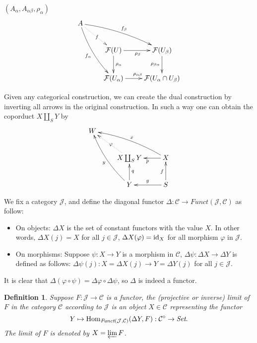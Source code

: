 \documentclass[9pt]{extarticle}
\theoremstyle{plain}
\newtheorem{defi}{Definition}
\newcommand{\cc}{\mathcal{C}}
\begin{document}
$(A_\alpha,A_{\alpha\beta},\rho_{\alpha})$
\[
\begin{xy}
	\xymatrix{
		A \ar@/_/[ddr]_{f_\alpha} \ar@{.>}[dr]|{f} \ar@/^/[drr]^{f_\beta} \\  
	 	& \calf(U) \ar[d]^{\rho_\alpha} \ar[r]_{\rho_\beta} & \calf(U_\beta) \ar[d]_{\rho_{\beta\alpha}} \\
	 	& \calf(U_\alpha) \ar[r]^{\rho_{\alpha\beta}} & \calf(U_{\alpha}\cap U_\beta)
	}
\end{xy}
\]

Given any categorical construction, we can create the dual construction by inverting all arrows in the original construction. In such a way one can obtain the coporduct $X\coprod_S Y$ by
\[
\begin{xy}
	\xymatrix{
		W\\  
	 	& X \coprod_S Y \ar@{.>}[lu]|{\varphi} & X \ar[l]^p\ar@/_/[ull]_x  \\
	 	& Y \ar@/^/[uul]^y  \ar[u]_q& S\ar[u]^f\ar[l]_g
	}
\end{xy}
\]


We fix a category $\mathcal{J}$, and define the diagonal functor $\Delta:\cc\to \textit{Funct}(\mathcal{J},\cc)$ as follow:
\begin{itemize}
\item On objects: $\Delta X$ is the set of constant functors with the value $X$. In other words, $\Delta X(j)=X$ for all $j\in\mathcal{J}$, $\Delta X(\varphi)=\operatorname{id}_X$ for all morphism $\varphi$ in $\mathcal{J}$.
\item On morphisms: Suppose $\psi:X\to Y$ is a morphism in $\cc$, $\Delta\psi:\Delta X\to \Delta Y$ is defined as follows: $\Delta\psi(j):X=\Delta X(j)\to Y=\Delta Y(j)$ for all $j\in \mathcal{J}$.
\end{itemize}
It is clear that $\Delta(\varphi\circ\psi)=\Delta\varphi\circ\Delta\psi$, so $\Delta$ is indeed a functor.

\begin{defi}
	Suppose $F:\mathcal{J}\to \cc$ is a functor, the (projective or inverse) limit of $F$ in the category $\cc$ according to $\mathcal{J}$ is an object $X\in\cc$ representing the functor
	\[
		Y\mapsto \Hom_{\textit{Funct}(\mathcal{J},\cc)}(\Delta Y,F):\cc^\circ\to \textit{Set}.
	\]
	The limit of $F$ is denoted by $X=\varprojlim F$.
\end{defi}
\end{document}
